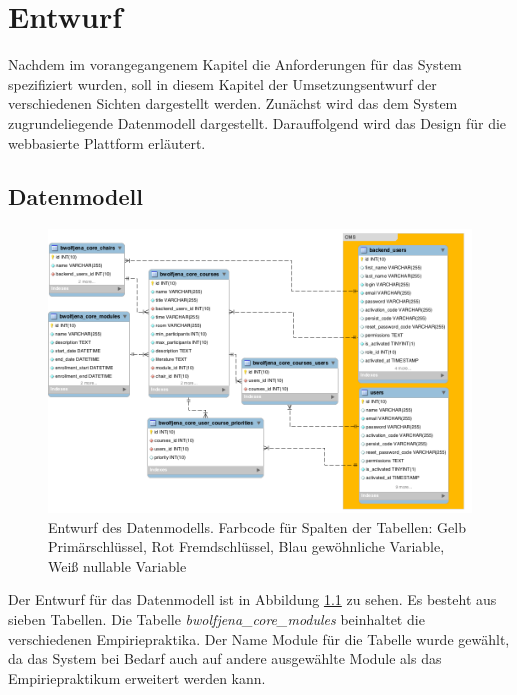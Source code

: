 
\chapter{Entwurf}
\label{chapter:design}
    Nachdem im vorangegangenem Kapitel die Anforderungen für das System spezifiziert wurden, soll in diesem Kapitel der Umsetzungsentwurf der verschiedenen Sichten dargestellt werden.
    Zunächst wird das dem System zugrundeliegende Datenmodell dargestellt.
    Darauffolgend wird das Design für die webbasierte Plattform erläutert.     
    
    \section{Datenmodell}
        \begin{figure}
            \centering
            \includegraphics[width=1.0\textwidth]{./design/images/data-model.png}\par\vspace{1cm}
            \caption{Entwurf des Datenmodells. Farbcode für Spalten der Tabellen: Gelb Primärschlüssel, Rot Fremdschlüssel, Blau gewöhnliche Variable, Weiß nullable Variable}
            \label{fig:datamodel}
        \end{figure}
    
        Der Entwurf für das Datenmodell ist in Abbildung \ref{fig:datamodel} zu sehen.
        Es besteht aus sieben Tabellen.
        Die Tabelle \textit{bwolfjena\_core\_modules} beinhaltet die verschiedenen Empiriepraktika.
        Der Name Module für die Tabelle wurde gewählt, da das System bei Bedarf auch auf andere ausgewählte Module als das Empiriepraktikum erweitert werden kann.
        
